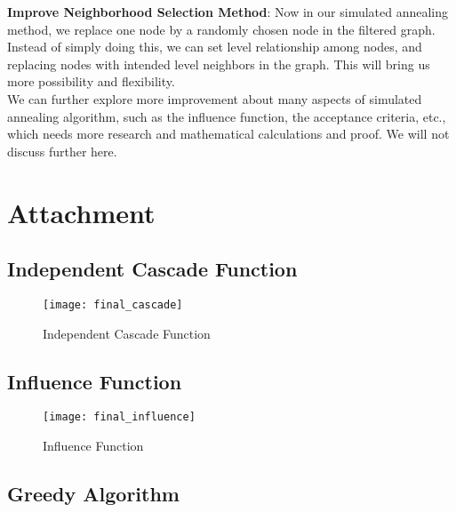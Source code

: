 \documentclass{article}
\begin{document}
\textbf{Improve Neighborhood Selection Method}: Now in our simulated annealing method, we replace one node by a randomly chosen node in the filtered graph. Instead of simply doing this, we can set level relationship among nodes, and replacing nodes with intended level neighbors in the graph. This will bring us more possibility and flexibility. \\

We can further explore more improvement about many aspects of simulated annealing algorithm, such as the influence function, the acceptance criteria, etc., which needs more research and mathematical calculations and proof. We will not discuss further here.

\newpage
\section{Attachment}

\subsection{Independent Cascade Function}

\begin{figure}[h]
\begin{center}
\texttt{[image: final\_cascade]} %
\caption{Independent Cascade Function}
\end{center}
\end{figure}

\newpage
\subsection{Influence Function}

\begin{figure}[h]
\begin{center}
\texttt{[image: final\_influence]} %
\caption{Influence Function}
\end{center}
\end{figure}


\newpage
\subsection{Greedy Algorithm}
\end{document}
